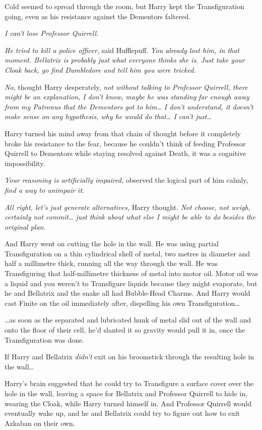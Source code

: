 Cold seemed to spread through the room, but Harry kept the Transfiguration going, even as his resistance against the Dementors faltered.

\emph{I can't lose Professor Quirrell.}

\emph{He tried to kill a police officer,} said Hufflepuff. \emph{You already lost him, in that moment. Bellatrix is probably just what everyone thinks she is. Just take your Cloak back, go find Dumbledore and tell him you were tricked.}

\emph{No,} thought Harry desperately, \emph{not without talking to Professor Quirrell, there might be an explanation, I don't know, maybe he was standing far enough away from my Patronus that the Dementors got to him{\ldots} I don't understand, it doesn't make sense on any hypothesis, why he would do that{\ldots} I can't just{\ldots}}

Harry turned his mind away from that chain of thought before it completely broke his resistance to the fear, because he couldn't think of feeding Professor Quirrell to Dementors while staying resolved against Death, it was a cognitive impossibility.

\emph{Your reasoning is artificially impaired,} observed the logical part of him calmly, \emph{find a way to unimpair it}.

\emph{All right, let's just generate alternatives,} Harry thought. \emph{Not choose, not weigh, certainly not commit{\ldots} just think about what else I might be able to do besides the original plan.}

And Harry went on cutting the hole in the wall. He was using partial Transfiguration on a thin cylindrical shell of metal, two metres in diameter and half a millimetre thick, running all the way through the wall. He was Transfiguring that half-millimetre thickness of metal into motor oil. Motor oil was a liquid and you weren't to Transfigure liquids because they might evaporate, but he and Bellatrix and the snake all had Bubble-Head Charms. And Harry would cast Finite on the oil immediately after, dispelling his own Transfiguration{\ldots}

{\ldots}as soon as the separated and lubricated hunk of metal slid out of the wall and onto the floor of their cell, he'd slanted it so gravity would pull it in, once the Transfiguration was done.

If Harry and Bellatrix \emph{didn't} exit on his broomstick through the resulting hole in the wall{\ldots}

Harry's brain suggested that he could try to Transfigure a surface cover over the hole in the wall, leaving a space for Bellatrix and Professor Quirrell to hide in, wearing the Cloak, while Harry turned himself in. And Professor Quirrell would eventually wake up, and he and Bellatrix could try to figure out how to exit Azkaban on their own.

